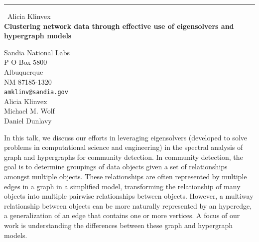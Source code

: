 \documentclass{report}
\begin{document}
\begin{center}
\rule{6in}{1pt} \
{\large Alicia Klinvex \\
{\bf Clustering network data through effective use of eigensolvers and hypergraph models}}

Sandia National Labs \\ P O Box 5800 \\ Albuquerque \\ NM 87185-1320
\\
{\tt amklinv@sandia.gov}\\
Alicia Klinvex\\
Michael M. Wolf\\
Daniel Dunlavy\end{center}

In this talk, we discuss our efforts in leveraging eigensolvers (developed to
solve problems in computational science and engineering) in the spectral
analysis of graph and hypergraphs for community detection. In community
detection, the goal is to determine groupings of data objects given a set of
relationships amongst multiple objects. These relationships are often
represented by multiple edges in a graph in a simplified model, transforming the
relationship of many objects into multiple pairwise relationships between
objects. However, a multiway relationship between objects can be more
naturally represented by an hyperedge, a generalization of an edge that
contains one or more vertices. A focus of our work is understanding the
differences between these graph and hypergraph models.
\end{document}

